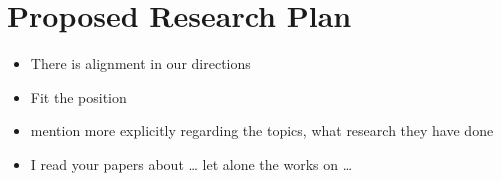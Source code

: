 \section{Proposed Research Plan}

\todo{}

\begin{itemize}
	\item There is alignment in our directions
	\item Fit the position
\end{itemize}

\begin{itemize}
	\item mention more explicitly regarding the topics, what research they have done
	\item I read your papers about … let alone the works on …
\end{itemize}
